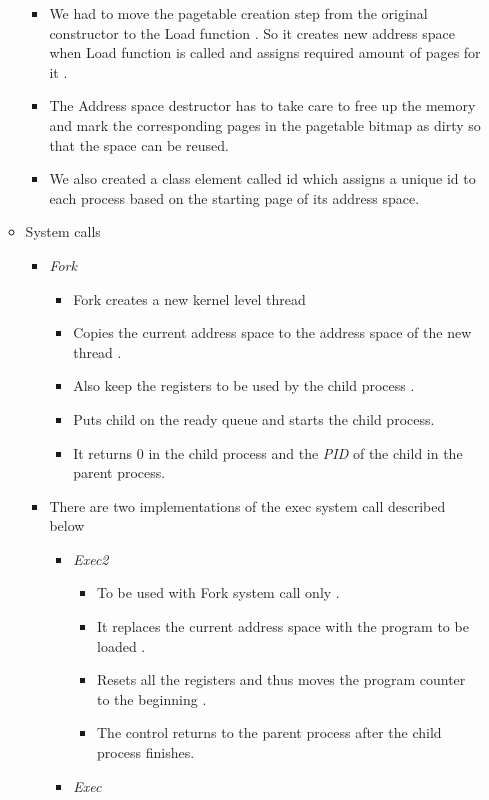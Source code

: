 \documentclass{article}
\begin{document}
\begin{itemize}
\begin{itemize}
\begin{itemize}
    \item
      We had to move the pagetable creation step from the original
      constructor to the Load function . So it creates new address space
      when Load function is called and assigns required amount of pages
      for it .
    \item
      The Address space destructor has to take care to free up the
      memory and mark the corresponding pages in the pagetable bitmap as
      dirty so that the space can be reused.
    \item
      We also created a class element called id which assigns a unique
      id to each process based on the starting page of its address
      space.
    \end{itemize}
  \item
    System calls

    \begin{itemize}
    \item
      \emph{Fork}

      \begin{itemize}
      \item
        Fork creates a new kernel level thread
      \item
        Copies the current address space to the address space of the new
        thread .
      \item
        Also keep the registers to be used by the child process .
      \item
        Puts child on the ready queue and starts the child process.
      \item
        It returns 0 in the child process and the \emph{PID} of the
        child in the parent process.
      \end{itemize}
    \item
      There are two implementations of the exec system call described
      below

      \begin{itemize}
      \item
        \emph{Exec2}

        \begin{itemize}
        \item
          To be used with Fork system call only .
        \item
          It replaces the current address space with the program to be
          loaded .
        \item
          Resets all the registers and thus moves the program counter to
          the beginning .
        \item
          The control returns to the parent process after the child
          process finishes.
        \end{itemize}
      \item
        \emph{Exec}


\end{itemize}
\end{itemize}
\end{itemize}
\end{itemize}
\end{document}
